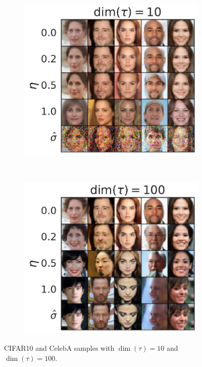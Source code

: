 \begin{figure}
    ~
        \begin{subfigure}{0.23\textwidth}
    \includegraphics[width=\textwidth]{figures/celeba-dim10.pdf}
    \end{subfigure}
    ~
    \begin{subfigure}{0.23\textwidth}
    \includegraphics[width=\textwidth]{figures/celeba-dim100.pdf}
    \end{subfigure}
    \caption{CIFAR10 and CelebA samples with $\dim(\tau) = 10$ and $\dim(\tau) = 100$.}
    \label{fig:cifar10-tvh}
\end{figure}

